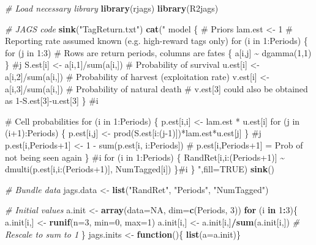 \documentclass[
]{krantz}
\makeatletter
\newenvironment{Shaded}{\begin{snugshade}}{\end{snugshade}}
\newcommand{\AttributeTok}[1]{\textcolor[rgb]{0.27,0.27,0.27}{#1}}
\newcommand{\CommentTok}[1]{\textcolor[rgb]{0.37,0.37,0.37}{\textit{#1}}}
\newcommand{\ConstantTok}[1]{\textcolor[rgb]{0.37,0.37,0.37}{#1}}
\newcommand{\ControlFlowTok}[1]{\textcolor[rgb]{0.27,0.27,0.27}{\textbf{#1}}}
\newcommand{\DecValTok}[1]{\textcolor[rgb]{0.06,0.06,0.06}{#1}}
\newcommand{\FunctionTok}[1]{\textcolor[rgb]{0.27,0.27,0.27}{\textbf{#1}}}
\newcommand{\NormalTok}[1]{#1}
\newcommand{\OtherTok}[1]{\textcolor[rgb]{0.37,0.37,0.37}{#1}}
\newcommand{\SpecialCharTok}[1]{\textcolor[rgb]{0.43,0.43,0.43}{\textbf{#1}}}
\newcommand{\StringTok}[1]{\textcolor[rgb]{0.5,0.5,0.5}{#1}}
\newenvironment{kframe}{%
\medskip{}
\setlength{\fboxsep}{.8em}
 \def\at@end@of@kframe{}%
 \ifinner\ifhmode%
  \def\at@end@of@kframe{\end{minipage}}%
  \begin{minipage}{\columnwidth}%
 \fi\fi%
 \def\FrameCommand##1{\hskip\@totalleftmargin \hskip-\fboxsep
 \colorbox{shadecolor}{##1}\hskip-\fboxsep
     \hskip-\linewidth \hskip-\@totalleftmargin \hskip\columnwidth}%
 \MakeFramed {\advance\hsize-\width
   \@totalleftmargin\z@ \linewidth\hsize
   \@setminipage}}%
 {\par\unskip\endMakeFramed%
 \at@end@of@kframe}
\renewenvironment{Shaded}{\begin{kframe}}{\end{kframe}}
\makeatother
\begin{document}
\begin{Shaded}
\begin{Highlighting}[]
\CommentTok{\# Load necessary library}
\FunctionTok{library}\NormalTok{(rjags)}
\FunctionTok{library}\NormalTok{(R2jags)}

  \CommentTok{\# JAGS code}
  \FunctionTok{sink}\NormalTok{(}\StringTok{"TagReturn.txt"}\NormalTok{)}
  \FunctionTok{cat}\NormalTok{(}\StringTok{"}
\StringTok{  model \{}
\StringTok{  \# Priors}
\StringTok{  lam.est \textless{}{-} 1 \# Reporting rate assumed known (e.g. high{-}reward tags only)}
\StringTok{  for (i in 1:Periods) \{}
\StringTok{     for (j in 1:3) \# Rows are return periods, columns are fates}
\StringTok{       \{}
\StringTok{         a[i,j] \textasciitilde{} dgamma(1,1)}
\StringTok{       \} \#j}
\StringTok{     S.est[i] \textless{}{-} a[i,1]/sum(a[i,]) \# Probability of survival}
\StringTok{     u.est[i] \textless{}{-} a[i,2]/sum(a[i,]) \# Probability of harvest (exploitation rate)}
\StringTok{     v.est[i] \textless{}{-} a[i,3]/sum(a[i,]) \# Probability of natural death}
\StringTok{     \# v.est[3] could also be obtained as 1{-}S.est[3]{-}u.est[3]}
\StringTok{  \} \#i}

\StringTok{\# Cell probabilities}
\StringTok{  for (i in 1:Periods) \{}
\StringTok{    p.est[i,i] \textless{}{-} lam.est * u.est[i]}
\StringTok{    for (j in (i+1):Periods) \{}
\StringTok{      p.est[i,j] \textless{}{-} prod(S.est[i:(j{-}1)])*lam.est*u.est[j]}
\StringTok{      \} \#j}
\StringTok{    p.est[i,Periods+1] \textless{}{-} 1 {-} sum(p.est[i, i:Periods])}
\StringTok{    \# p.est[i,Periods+1] = Prob of not being seen again}
\StringTok{    \} \#i}
\StringTok{  for (i in 1:Periods) \{}
\StringTok{  RandRet[i,i:(Periods+1)] \textasciitilde{} dmulti(p.est[i,i:(Periods+1)], NumTagged[i])}
\StringTok{  \}\#i}
\StringTok{ \}}
\StringTok{  "}\NormalTok{,}\AttributeTok{fill=}\ConstantTok{TRUE}\NormalTok{)}
  \FunctionTok{sink}\NormalTok{()}

\CommentTok{\# Bundle data}
\NormalTok{  jags.data }\OtherTok{\textless{}{-}} \FunctionTok{list}\NormalTok{(}\StringTok{"RandRet"}\NormalTok{, }\StringTok{"Periods"}\NormalTok{, }\StringTok{"NumTagged"}\NormalTok{)}

\CommentTok{\# Initial values}
\NormalTok{  a.init }\OtherTok{\textless{}{-}} \FunctionTok{array}\NormalTok{(}\AttributeTok{data=}\ConstantTok{NA}\NormalTok{, }\AttributeTok{dim=}\FunctionTok{c}\NormalTok{(Periods, }\DecValTok{3}\NormalTok{))}
  \ControlFlowTok{for}\NormalTok{ (i }\ControlFlowTok{in} \DecValTok{1}\SpecialCharTok{:}\DecValTok{3}\NormalTok{)\{}
\NormalTok{    a.init[i,] }\OtherTok{\textless{}{-}} \FunctionTok{runif}\NormalTok{(}\AttributeTok{n=}\DecValTok{3}\NormalTok{, }\AttributeTok{min=}\DecValTok{0}\NormalTok{, }\AttributeTok{max=}\DecValTok{1}\NormalTok{)}
\NormalTok{    a.init[i,] }\OtherTok{\textless{}{-}}\NormalTok{ a.init[i,]}\SpecialCharTok{/}\FunctionTok{sum}\NormalTok{(a.init[i,]) }\CommentTok{\# Rescale to sum to 1}
\NormalTok{  \}}
\NormalTok{  jags.inits }\OtherTok{\textless{}{-}} \ControlFlowTok{function}\NormalTok{()\{ }\FunctionTok{list}\NormalTok{(}\AttributeTok{a=}\NormalTok{a.init)\}}


\end{Highlighting}
\end{Shaded}
\end{document}
